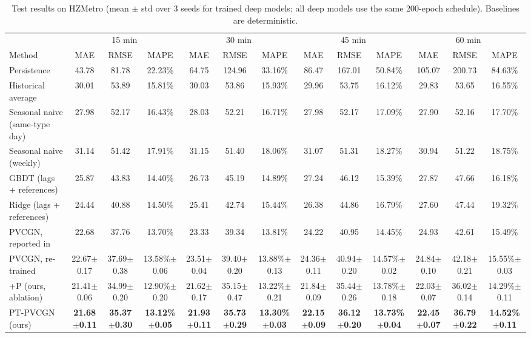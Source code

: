 \begin{table}[t]
\centering
\caption{Test results on HZMetro (mean $\pm$ std over 3 seeds for trained deep models; all deep models use the same 200-epoch schedule). Baselines are deterministic.}
\label{tab:hz}
\scriptsize
\setlength{\tabcolsep}{3pt}
\begin{tabular}{lcccccccccccc}
\toprule
 & \multicolumn{3}{c}{15 min} & \multicolumn{3}{c}{30 min} & \multicolumn{3}{c}{45 min} & \multicolumn{3}{c}{60 min} \\
\cmidrule(lr){2-4} \cmidrule(lr){5-7} \cmidrule(lr){8-10} \cmidrule(lr){11-13}
Method & MAE & RMSE & MAPE & MAE & RMSE & MAPE & MAE & RMSE & MAPE & MAE & RMSE & MAPE \\
\midrule
Persistence & 43.78 & 81.78 & 22.23\% & 64.75 & 124.96 & 33.16\% & 86.47 & 167.01 & 50.84\% & 105.07 & 200.73 & 84.63\% \\
Historical average & 30.01 & 53.89 & 15.81\% & 30.03 & 53.86 & 15.93\% & 29.96 & 53.75 & 16.12\% & 29.83 & 53.65 & 16.55\% \\
Seasonal naive (same-type day) & 27.98 & 52.17 & 16.43\% & 28.03 & 52.21 & 16.71\% & 27.98 & 52.17 & 17.09\% & 27.90 & 52.16 & 17.70\% \\
Seasonal naive (weekly) & 31.14 & 51.42 & 17.91\% & 31.15 & 51.40 & 18.06\% & 31.07 & 51.31 & 18.27\% & 30.94 & 51.22 & 18.75\% \\
GBDT (lags + references) & 25.87 & 43.83 & 14.40\% & 26.73 & 45.19 & 14.89\% & 27.24 & 46.12 & 15.39\% & 27.87 & 47.66 & 16.18\% \\
Ridge (lags + references) & 24.44 & 40.88 & 14.50\% & 25.41 & 42.74 & 15.44\% & 26.38 & 44.86 & 16.79\% & 27.60 & 47.44 & 19.32\% \\
\midrule
PVCGN, reported in~\cite{liu2022pvcgn} & 22.68 & 37.76 & 13.70\% & 23.33 & 39.34 & 13.81\% & 24.22 & 40.95 & 14.45\% & 24.93 & 42.61 & 15.49\% \\
PVCGN, re-trained & 22.67\tiny{$\pm$0.17} & 37.69\tiny{$\pm$0.38} & 13.58\%\tiny{$\pm$0.06} & 23.51\tiny{$\pm$0.04} & 39.40\tiny{$\pm$0.20} & 13.88\%\tiny{$\pm$0.13} & 24.36\tiny{$\pm$0.11} & 40.94\tiny{$\pm$0.20} & 14.57\%\tiny{$\pm$0.02} & 24.84\tiny{$\pm$0.10} & 42.18\tiny{$\pm$0.21} & 15.55\%\tiny{$\pm$0.03} \\
\midrule
+P (ours, ablation) & 21.41\tiny{$\pm$0.06} & 34.99\tiny{$\pm$0.20} & 12.90\%\tiny{$\pm$0.20} & 21.62\tiny{$\pm$0.17} & 35.15\tiny{$\pm$0.47} & 13.22\%\tiny{$\pm$0.21} & 21.84\tiny{$\pm$0.09} & 35.44\tiny{$\pm$0.26} & 13.78\%\tiny{$\pm$0.18} & 22.03\tiny{$\pm$0.07} & 36.02\tiny{$\pm$0.14} & 14.29\%\tiny{$\pm$0.11} \\
PT-PVCGN (ours) & \textbf{21.68\tiny{$\pm$0.11}} & \textbf{35.37\tiny{$\pm$0.30}} & \textbf{13.12\%\tiny{$\pm$0.05}} & \textbf{21.93\tiny{$\pm$0.11}} & \textbf{35.73\tiny{$\pm$0.29}} & \textbf{13.30\%\tiny{$\pm$0.03}} & \textbf{22.15\tiny{$\pm$0.09}} & \textbf{36.12\tiny{$\pm$0.20}} & \textbf{13.73\%\tiny{$\pm$0.04}} & \textbf{22.45\tiny{$\pm$0.07}} & \textbf{36.79\tiny{$\pm$0.22}} & \textbf{14.52\%\tiny{$\pm$0.11}} \\
\bottomrule
\end{tabular}
\end{table}